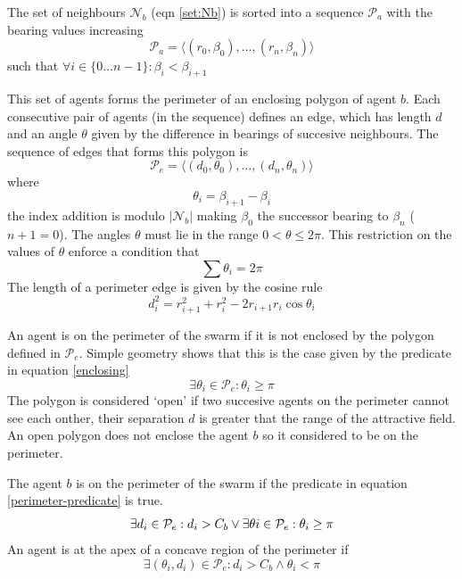 \documentclass{ieeeaccess}
\begin{document}
The set of neighbours $\mathcal N_b$ (eqn \ref{set:Nb}) is sorted into a
sequence $\mathcal P_a$ with the bearing values
increasing
\begin{equation}
	\mathcal P_a = \langle (r_0,\beta_0),\ldots,(r_n,\beta_n) \rangle
\end{equation}
such that $\forall i \in \{0\ldots n-1\}: \beta_i<\beta_{i+1}$

This set of agents forms the perimeter of an enclosing polygon of agent $b$. 
Each consecutive pair of agents (in the sequence) defines an edge, which has
length $d$ and an angle $\theta$ given by the difference in bearings of
succesive neighbours.  The sequence of edges
that forms this polygon is
\begin{equation}
	\mathcal{P}_e = \langle (d_0,\theta_0), \ldots , (d_n,\theta_n) \rangle
\end{equation}
where
\begin{equation}
	\theta_i = \beta_{i+1} - \beta_i
\end{equation}
the index addition is modulo $|\mathcal N_b|$ making $\beta_0$ the successor
bearing to $\beta_n$ ($n+1 = 0$).  The angles $\theta$ must lie in the range
$0<\theta\leq2\pi$.
This restriction on the values of $\theta$ enforce a condition that
\begin{equation}
	\sum\theta_i = 2\pi
\end{equation}
The length of a perimeter edge is given by the cosine rule
\begin{equation}
	d_i^2 = r_{i+1}^2 + r_i^2 -2r_{i+1}r_i \cos\theta_i
\end{equation}

An agent is on the perimeter of the swarm if it is not enclosed by the polygon
defined in $\mathcal{P}_e$.  Simple geometry shows that this is the case given
by the predicate in equation \ref{enclosing}
\begin{equation}
	\exists \theta_i \in \mathcal{P}_e : \theta_i\geq\pi
	\label{enclosing}
\end{equation}
The polygon is considered `open' if two succesive agents on the perimeter 
cannot see each onther, their separation $d$ is greater that the range of the
attractive field.  An open polygon does not enclose the agent $b$ so it
considered to be on the perimeter.

The agent $b$ is on the perimeter of the swarm if the predicate in equation
\ref{perimeter-predicate} is true.
\begin{equation}
	\exists d_i\in\mathcal{P}_e:d_i>C_b \vee
	\exists\theta\-i\in\mathcal{P}_e:\theta_i\geq\pi
	\label{perimeter-predicate}
\end{equation}
An agent is at the apex of a concave region of the perimeter if
\begin{equation}
	\exists(\theta_i,d_i)\in\mathcal{P}_e : d_i>C_b\wedge\theta_i<\pi
	\label{concave-predicate}
\end{equation}
\end{document}

